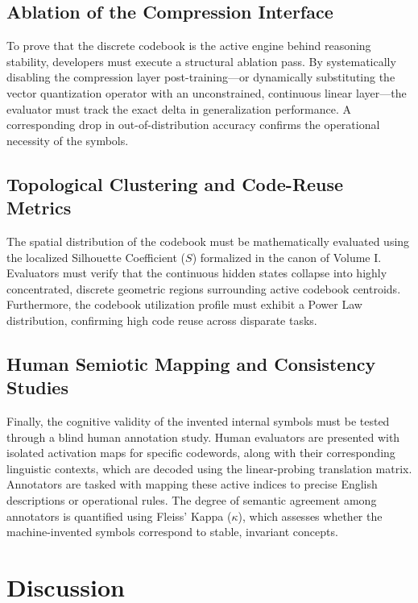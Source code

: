 \section{Ablation of the Compression Interface}
To prove that the discrete codebook is the active engine behind reasoning stability, developers must execute a structural ablation pass. By systematically disabling the compression layer post-training—or dynamically substituting the vector quantization operator with an unconstrained, continuous linear layer—the evaluator must track the exact delta in generalization performance. A corresponding drop in out-of-distribution accuracy confirms the operational necessity of the symbols.

\section{Topological Clustering and Code-Reuse Metrics}
The spatial distribution of the codebook must be mathematically evaluated using the localized Silhouette Coefficient ($S$) formalized in the canon of Volume I. Evaluators must verify that the continuous hidden states collapse into highly concentrated, discrete geometric regions surrounding active codebook centroids. Furthermore, the codebook utilization profile must exhibit a Power Law distribution, confirming high code reuse across disparate tasks.

\section{Human Semiotic Mapping and Consistency Studies}
Finally, the cognitive validity of the invented internal symbols must be tested through a blind human annotation study. Human evaluators are presented with isolated activation maps for specific codewords, along with their corresponding linguistic contexts, which are decoded using the linear-probing translation matrix. Annotators are tasked with mapping these active indices to precise English descriptions or operational rules. The degree of semantic agreement among annotators is quantified using Fleiss' Kappa ($\kappa$), which assesses whether the machine-invented symbols correspond to stable, invariant concepts.

\chapter{Discussion}
